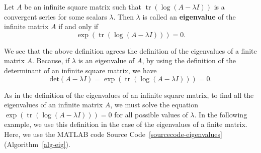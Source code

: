 \begin{definition}\label{eigenvalues_of_an_infinite_matrix}
Let $A$ be an infinite square matrix such that $\operatorname{tr}(\log(A - \lambda I))$ is a convergent series for some scalars $\lambda$. Then $\lambda$ is called an \textbf{eigenvalue} of the infinite matrix $A$ if and only if $$\exp(\operatorname{tr}(\log(A - \lambda I)))=0.$$
\end{definition}

We see that the above definition agrees the definition of the eigenvalues of a finite matrix $A$. Because, if $\lambda$ is an eigenvalue of $A$, by using the definition of the determinant of an infinite square matrix, we have 
\[
\text{det}(A - \lambda I) = \exp(\operatorname{tr}(\log(A - \lambda I))) = 0.
\]


As in the definition of the eigenvalues of an infinite square matrix, to find all the eigenvalues of an infinite matrix $A$, we must solve the equation $\exp(\operatorname{tr}(\log(A - \lambda I)))=0$ for all possible values of $\lambda$. In the following example, we use this definition in the case of the eigenvalues of a finite matrix. Here, we use the MATLAB code Source Code~\ref{sourcecode-eigenvalues} (Algorithm~\ref{alg-eig}). 


